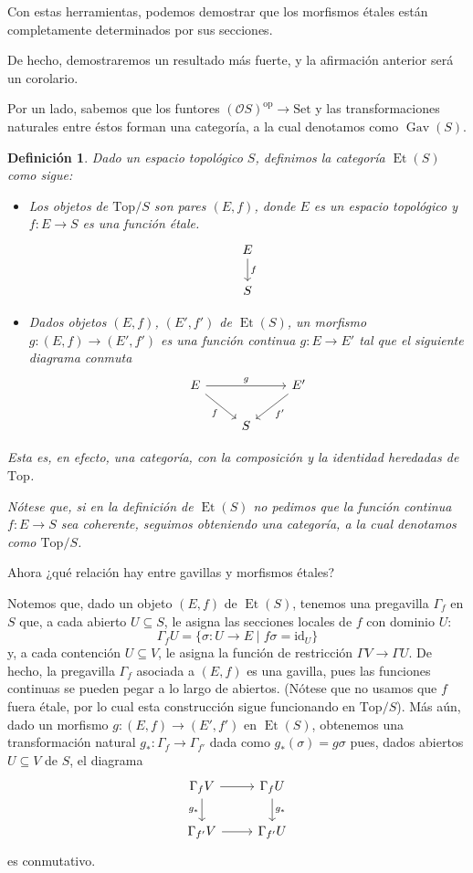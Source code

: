\documentclass[12pt,letterpaper,titlepage]{article}
\newtheorem*{defn}{Definición}
\theoremstyle{definition}
\renewcommand\cal[1]{\mathcal{#1}}
\newcommand\<{\langle}
\renewcommand\>{\rangle}
\newcommand{\Con}{\mathrm{Set}}
\newcommand{\Top}{\mathrm{Top}}
\newcommand{\id}{\mathrm{id}}
\newcommand{\op}{\mathrm{op}}
\DeclareMathOperator{\Gav}{Gav}
\DeclareMathOperator{\Et}{Et}
\begin{document}
Con estas herramientas,
podemos demostrar que los morfismos étales
están completamente determinados por sus secciones.

De hecho, demostraremos un resultado más fuerte,
y la afirmación anterior será un corolario.

Por un lado, sabemos que los funtores $(\cal OS)^\op\to\Con$
y las transformaciones naturales entre éstos
forman una categoría, a la cual denotamos como $\Gav(S)$.

\begin{defn}
    Dado un espacio topológico $S$, definimos la categoría
    $\Et(S)$ como sigue:
    \begin{itemize}
        \item
        Los objetos de $\Top/S$ son pares $(E,f)$,
        donde $E$ es un espacio topológico
        y $f:E\to S$ es una función étale.
        \[
            \begin{tikzcd}
                E \ar[d,"f"] \\ S
            \end{tikzcd}
        \]
        \item
        Dados objetos $(E,f)$, $(E',f')$ de $\Et(S)$,
        un morfismo $g:(E,f)\to(E',f')$ es una función
        continua $g:E\to E'$ tal que el siguiente diagrama conmuta
        \[
            \begin{tikzcd}
                E \ar[dr,"f"'] \ar[rr,"g"] && E' \ar[dl,"f'"]
                \\ & S
            \end{tikzcd}
        \]
    \end{itemize}
    Esta es, en efecto, una categoría,
    con la composición y la identidad
    heredadas de $\Top$.
    
    Nótese que, si en la definición de $\Et(S)$
    no pedimos que la función continua $f:E\to S$ sea coherente,
    seguimos obteniendo una categoría,
    a la cual denotamos como $\Top/S$.
\end{defn}

Ahora ¿qué relación hay entre gavillas y morfismos étales?

Notemos que, dado un objeto $(E,f)$ de $\Et(S)$,
tenemos una pregavilla $\Gamma_f$ en $S$ que,
a cada abierto $U\subseteq S$, le asigna las secciones locales
de $f$ con dominio $U$:
\[
    \Gamma_f U = \{\sigma:U\to E\mid f\sigma = \id_U\}
\]
y, a cada contención $U\subseteq V$, le asigna
la función de restricción $\Gamma V\to\Gamma U$.
De hecho, la pregavilla $\Gamma_f$ asociada a $(E,f)$ es una gavilla,
pues las funciones continuas se pueden pegar a lo largo de abiertos.
(Nótese que no usamos que $f$ fuera étale, por lo cual esta
construcción sigue funcionando en $\Top/S$).
Más aún, dado un morfismo $g:(E,f)\to(E',f')$ en $\Et(S)$,
obtenemos una transformación natural $g_*:\Gamma_f\to\Gamma_{f'}$
dada como $g_*(\sigma)=g\sigma$ pues,
dados abiertos $U\subseteq V$ de $S$, el diagrama
\[
    \begin{tikzcd}
        \Gamma_fV \ar[d,"g_*"'] \ar[r] & \Gamma_fU \ar[d,"g_*"] \\
        \Gamma_{f'}V \ar[r] & \Gamma_{f'}U
    \end{tikzcd}
\]
es conmutativo.
\end{document}
